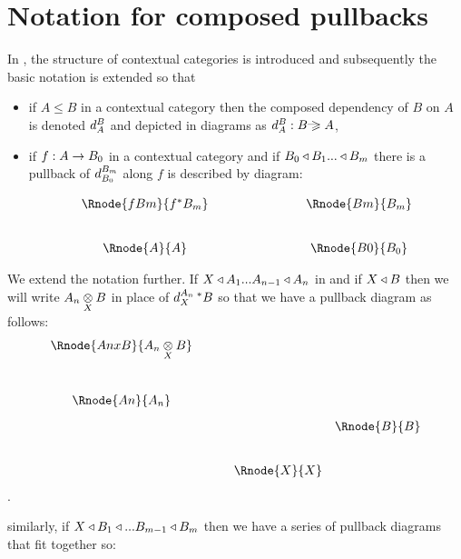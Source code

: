 \documentclass[10pt,a4paper]{scrartcl}
\begin{document}
\newpage


\section{Notation for composed pullbacks}
In \cite{Cartmell86}, the structure of contextual categories is introduced and subsequently
the basic notation is extended so that 
\begin{itemize}
\item{if $A \leq B$ in a contextual category then the composed dependency of
$B$ on $A$ is 
denoted $\pc{B}{A}$ and depicted in diagrams as $\pc{B}{A}:B \raisebox{1pt}{---}\!\!\!\!\!\!\geqslant A$,}
\item{if $f: A \morph B_0$ in a contextual category  and if 
$B_0 \base B_1 ... \base B_m$ there is a  pullback of $\pc{B_m}{B_0}$ along $f$
is described by diagram:

\begin{displaymath}
\begin{array}{cp{2cm}c}
\Rnode{fBm} {f \sub B_m}    &            &  \Rnode{Bm}{B_m}   \\ [0.8cm]
\Rnode{A}{A}                &            &  \Rnode{B0}{B_0}   
\end{array}
\end{displaymath}
}
\end{itemize}


We extend the notation further. If $X \base A_1 ... A_{n-1} \base A_n$ in  and
if $X \base B$ then we will write $\crossx{A_n}{B}{X}$ in place of $\pc{A_n}{X}\,\sub B$ so that 
we have a pullback diagram as follows:
\begin{displaymath}
\begin{array}{c p{0.45cm} c c}
\Rnode{AnxB}{\crossx{A_n}{B}{X}}&&            &              \\ [1.1cm]
\Rnode{An}{A_n}                 &&            &               \\ [0.3cm]
                                &&            & \Rnode{B}{B}  \\ [0.8cm]
                                &&\Rnode{X}{X}&                
\end{array}
\end{displaymath}
.

similarly, if $X \base B_1 \base ... B_{m-1} \base B_m$ then we have a series of pullback diagrams that fit together so:
\end{document}
